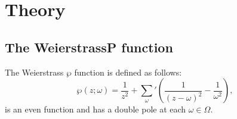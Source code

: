 \newpage
\section{Theory}

\subsection{The WeierstrassP function}

The Weierstrass $\wp$ function is defined as follows:
\[
    \wp(z; \omega) = \frac{1}{z^2} + \sum_{\omega}{'} ( \frac{1}{(z-\omega)^2} - \frac{1}{\omega^2} ) ,
\]
is an even function and has a double pole at each $\omega \in \Omega$.